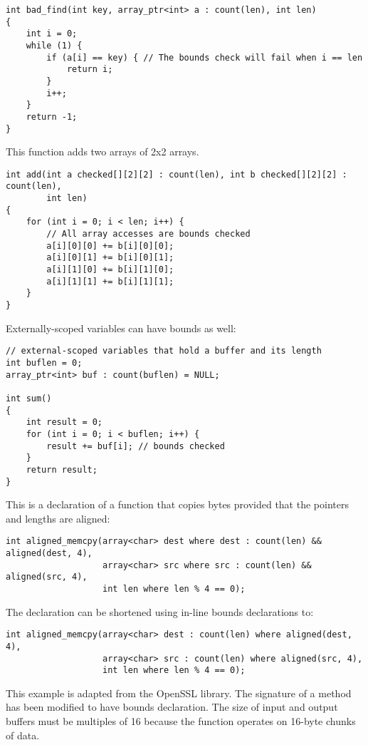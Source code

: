 \begin{verbatim}
int bad_find(int key, array_ptr<int> a : count(len), int len)
{
    int i = 0;
    while (1) {
        if (a[i] == key) { // The bounds check will fail when i == len
            return i;
        }
        i++;
    }
    return -1;
}

\end{verbatim}

This function adds two arrays of 2x2 arrays.

\begin{verbatim}
int add(int a checked[][2][2] : count(len), int b checked[][2][2] : count(len), 
        int len) 
{
    for (int i = 0; i < len; i++) {
        // All array accesses are bounds checked
        a[i][0][0] += b[i][0][0]; 
        a[i][0][1] += b[i][0][1];
        a[i][1][0] += b[i][1][0];
        a[i][1][1] += b[i][1][1];
    }
}
\end{verbatim}

Externally-scoped variables can have bounds as well:

\begin{verbatim}
// external-scoped variables that hold a buffer and its length
int buflen = 0;
array_ptr<int> buf : count(buflen) = NULL;

int sum()
{
    int result = 0;
    for (int i = 0; i < buflen; i++) {
        result += buf[i]; // bounds checked
    }
    return result;
}
\end{verbatim}

This is a declaration of a function that copies bytes provided that the
pointers and lengths are aligned:
\begin{verbatim}
int aligned_memcpy(array<char> dest where dest : count(len) && aligned(dest, 4),
                   array<char> src where src : count(len) && aligned(src, 4),
                   int len where len % 4 == 0);
\end{verbatim}

The declaration can be shortened using in-line bounds declarations to:

\begin{verbatim}
int aligned_memcpy(array<char> dest : count(len) where aligned(dest, 4),
                   array<char> src : count(len) where aligned(src, 4),
                   int len where len % 4 == 0);
\end{verbatim}

This example is adapted from the OpenSSL library. The signature of a
method has been modified to have bounds declaration. The size of input
and output buffers must be multiples of 16 because the function operates
on 16-byte chunks of data.

